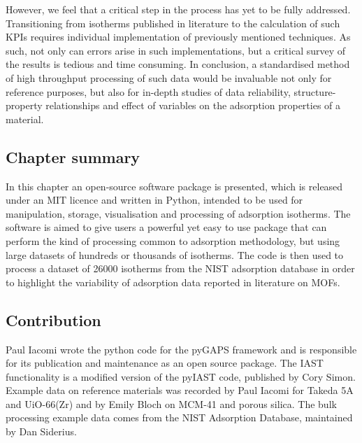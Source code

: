 However, we feel that a critical step in the process has yet
to be fully addressed. Transitioning from isotherms published in
literature to the calculation of such KPIs requires individual
implementation of previously mentioned techniques. As such,
not only can errors arise in such implementations, but
a critical survey of the results is tedious and time consuming.
In conclusion, a standardised method of high throughput processing
of such data would be invaluable not only for reference purposes,
but also for in-depth studies of data reliability,
structure-property relationships and effect of variables on
the adsorption properties of a material.

\subsection*{Chapter summary}

In this chapter an open-source software package is presented, which
is released under an MIT licence and written in Python, intended to be
used for manipulation, storage, visualisation and processing of
adsorption isotherms. The software is aimed to give users a powerful
yet easy to use package that can perform the kind of processing
common to adsorption methodology, but using large datasets of hundreds
or thousands of isotherms. The code is then used to process a
dataset of 26000 isotherms from the NIST adsorption database in order
to highlight the variability of adsorption data reported in literature
on MOFs.

\subsection*{Contribution}

Paul Iacomi wrote the python code for the pyGAPS framework and is
responsible for its publication and maintenance as an open source
package. The IAST functionality is a modified version of
the pyIAST code, published by Cory Simon. Example data on reference 
materials was recorded by Paul Iacomi for Takeda 5A and UiO-66(Zr) 
and by Emily Bloch on MCM-41 and porous silica. The bulk processing
example data comes from the NIST Adsorption Database, 
maintained by Dan Siderius.
